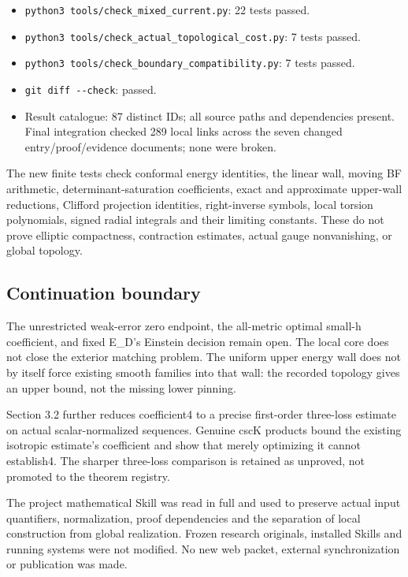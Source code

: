 \documentclass[
  10pt,
]{article}
\providecommand{\tightlist}{%
  \setlength{\itemsep}{0pt}\setlength{\parskip}{0pt}}
\begin{document}
\begin{itemize}
\tightlist
\item
  \texttt{python3\ tools/\nolinkurl{check_mixed_current.py}}: 22 tests passed.
\item
  \texttt{python3\ tools/\nolinkurl{check_actual_topological_cost.py}}: 7 tests
  passed.
\item
  \texttt{python3\ tools/\nolinkurl{check_boundary_compatibility.py}}: 7 tests
  passed.
\item
  \texttt{git\ diff\ -\/-check}: passed.
\item
  Result catalogue: 87 distinct IDs; all source paths and dependencies
  present. Final integration checked 289 local links across the seven
  changed entry/proof/evidence documents; none were broken.
\end{itemize}

The new finite tests check conformal energy identities, the linear wall,
moving BF arithmetic, determinant-saturation coefficients, exact and
approximate upper-wall reductions, Clifford projection identities,
right-inverse symbols, local torsion polynomials, signed radial
integrals and their limiting constants. These do not prove elliptic
compactness, contraction estimates, actual gauge nonvanishing, or global
topology.

\hypertarget{continuation-boundary}{%
\subsection{Continuation boundary}\label{continuation-boundary}}

The unrestricted weak-error zero endpoint, the all-metric optimal
small-h coefficient, and fixed E\_D's Einstein decision remain open. The
local core does not close the exterior matching problem. The uniform
upper energy wall does not by itself force existing smooth families into
that wall: the recorded topology gives an upper bound, not the missing
lower pinning.

Section 3.2 further reduces coefficient4 to a precise first-order
three-loss estimate on actual scalar-normalized sequences. Genuine cscK
products bound the existing isotropic estimate's coefficient and show
that merely optimizing it cannot establish4. The sharper three-loss
comparison is retained as unproved, not promoted to the theorem
registry.

The project mathematical Skill was read in full and used to preserve
actual input quantifiers, normalization, proof dependencies and the
separation of local construction from global realization. Frozen
research originals, installed Skills and running systems were not
modified. No new web packet, external synchronization or publication was
made.
\end{document}
